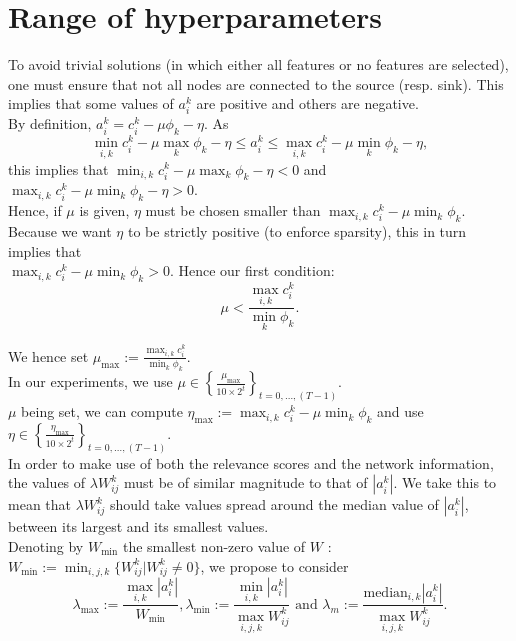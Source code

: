 \documentclass[12pt,a4paper]{article}
\begin{document}
\section{Range of hyperparameters}

To avoid trivial solutions (in which either all features or no features are selected), one must ensure that not all nodes are connected to the source (resp. sink). This implies that some values of $a_i^k$ are positive and others are negative.\\

By definition, $a_i^k = c_i^k - \mu \phi_k - \eta$. As
\[
\min_{i, k} c_i^k - \mu \max_k \phi_k - \eta \leq 
  a_i^k   \leq \max_{i, k} c_i^k - \mu \min_k \phi_k - \eta,
\]
this implies that $\min_{i, k} c_i^k - \mu \max_k \phi_k - \eta < 0$ and
$\max_{i, k} c_i^k - \mu \min_k \phi_k - \eta > 0$.\\

Hence, if $\mu$ is given, $\eta$ must be chosen smaller than 
$\max_{i, k} c_i^k - \mu \min_k \phi_k$.\\

Because we want $\eta$ to be strictly positive (to enforce sparsity), this in turn implies that\\ $\max_{i, k} c_i^k - \mu \min_k \phi_k > 0$. Hence our first condition:
\[ \mu < \frac{\max_{i, k} c_i^k}{\min_k \phi_k}.\]


We hence set $\mu_{\max} := \frac{\max_{i, k} c_i^k}{\min_k \phi_k}$.\\

In our experiments, we use $\mu \in \left\{ \frac{\mu_{\max}}{10 \times  2^t} \right \}_{t = 0, \dots, (T-1)}$.\\

$\mu$ being set, we can compute 
$\eta_{\max} := \max_{i, k} c_i^k - \mu \min_k \phi_k$ and use $\eta \in 
\left \{ \frac{\eta_{\max}}{10 \times 2^t} \right \}_{t = 0, \dots, (T-1)}$.\\

In order to make use of both the relevance scores and the network information, 
the values of $\lambda W_{ij}^k$ must be of similar magnitude to that of $|a_i^k|$. 
We take this to mean that $\lambda W_{ij}^k$ should take values spread around the median value of $|a_i^k|$,
between its largest and its smallest values.\\

Denoting by $W_{\min}$ the smallest non-zero value of $W$ : 
$W_{\min} := \min_{i, j, k} \{ W_{ij}^k | W_{ij}^k \neq 0\}$,
we propose to consider 
\[
\lambda_{\max} := \frac{\max_{i,k} |a_i^k|}{W_{\min}}, 
\lambda_{\min} := \frac{\min_{i,k} |a_i^k|}{\max_{i,j,k}W_{ij}^k} \mbox{ and }
\lambda_{m} := \frac{\mbox{median}_{i, k} |a_i^k|}{\max_{i,j,k}W_{ij}^k}.
\]
\end{document}
